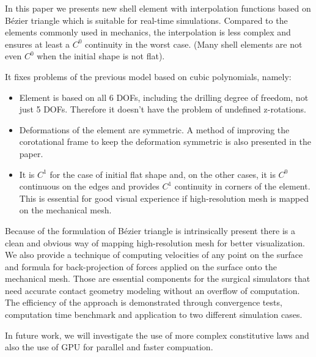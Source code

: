 \documentclass{egpubl}
\begin{document}
In this paper we presents new shell element with interpolation functions
based on B\'ezier triangle which is  suitable for real-time simulations.
Compared to  the elements commonly used in mechanics, the interpolation is less complex and ensures at least a $C^0$ continuity in the worst case. 
(Many shell elements are not even $C^0$ when the initial shape is not flat).

It fixes problems of the previous model \cite{Comas2010c} based on cubic polynomials, namely:

\begin{itemize}

    \item Element is based on all 6 DOFs, including the drilling degree of
        freedom, not just 5 DOFs. Therefore it doesn't have the problem of
        undefined z-rotations.

    \item Deformations of the element are symmetric. A method of improving
    the corotational frame to keep the deformation symmetric is also
    presented in the paper.

    \item It is $C^1$ for the case of initial flat shape and, on the other cases, it is $C^0$ continuous on the edges and provides $C^1$ continuity in
    corners of the element. This is essential for good visual experience if
    high-resolution mesh is mapped on the mechanical mesh.

\end{itemize}

Because of the formulation of B\'ezier triangle is intrinsically present
there is a clean and obvious way of mapping high-resolution mesh for better
visualization. We also provide a technique of computing velocities of any point
on the surface and formula for back-projection of forces applied on the
surface onto the mechanical mesh. 
Those are essential components for the surgical simulators that need accurate contact geometry modeling without an overflow of computation.
The efficiency of the approach is demonstrated through convergence tests,  computation time benchmark and application to two different  simulation cases.

In future work, we will investigate the use of more complex constitutive laws and also the use of GPU for parallel and faster compuation.



%



\end{document}
